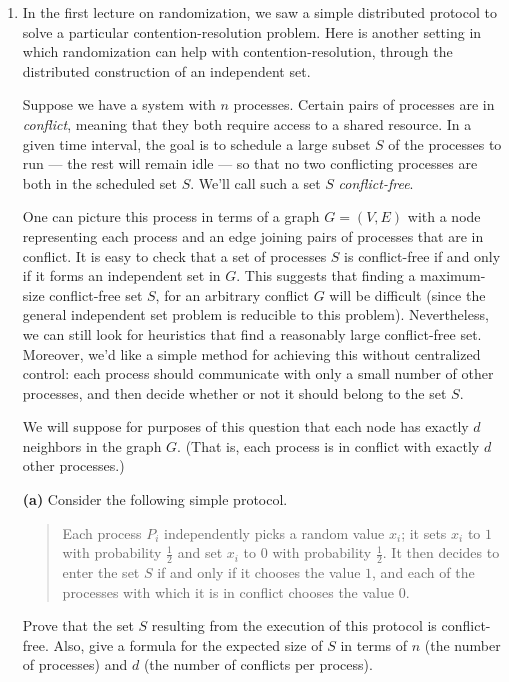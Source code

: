 \documentclass[12pt]{article}
\begin{document}
\begin{enumerate}




\item 

In the first lecture on randomization, we saw a simple
distributed protocol to solve a particular contention-resolution problem.
Here is another setting in which randomization
can help with contention-resolution, through the distributed
construction of an independent set.

Suppose we have a system with $n$ processes.
Certain pairs of processes are in {\em conflict},
meaning that they both require access to a shared resource.
In a given time interval, the goal is to schedule
a large subset $S$ of the processes to run --- the rest
will remain idle --- so that no two conflicting
processes are both in the scheduled set $S$.
We'll call such a set $S$ {\em conflict-free}.

One can picture this process in terms of a
graph $G = (V,E)$ with a node representing each process
and an edge joining pairs of processes that are in conflict.
It is easy to check that a set of processes $S$ is conflict-free
if and only if it forms an independent set in $G$.
This suggests that finding a maximum-size conflict-free set $S$,
for an arbitrary conflict $G$ will be difficult
(since the general independent set problem is reducible to
this problem).
Nevertheless, we can still look for heuristics
that find a reasonably large conflict-free set.
Moreover, we'd like a simple method for achieving this
without centralized control:
each process should communicate with only a small
number of other processes, and then decide whether or
not it should belong to the set $S$.

We will suppose for purposes of this question that each node
has exactly $d$ neighbors in the graph $G$.
(That is, each process is in conflict with exactly $d$
other processes.)

\medskip
{\bf (a)} Consider the following simple protocol.
\begin{quote}
Each process $P_i$ independently picks a random value $x_i$;
it sets $x_i$ to $1$ with probability $\frac12$
and set $x_i$ to $0$ with probability $\frac12$.
It then decides to enter the set $S$ if and only if
it chooses the value $1$, and each of the processes with
which it is in conflict chooses the value $0$.
\end{quote}
Prove that the set $S$ resulting from the
execution of this protocol is conflict-free.
Also, give a formula for the expected size of $S$
in terms of $n$ (the number of processes)
and $d$ (the number of conflicts per process).


\end{enumerate}
\end{document}
